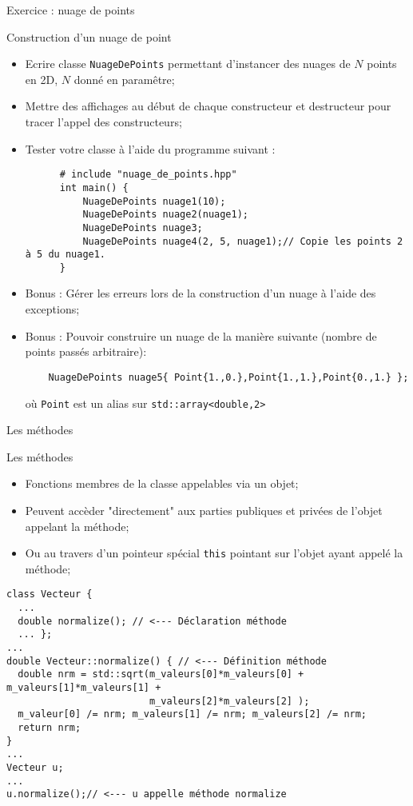 \documentclass[compress,10pt,aspectratio=169]{beamer}
\begin{document}
  \begin{frame}[fragile]{Exercice : nuage de points}
    \scriptsize
    \begin{exampleblock}{\small Construction d'un nuage de point}
    \begin{itemize}
      \item Ecrire classe \texttt{NuageDePoints} permettant d'instancer 
            des nuages de $N$ points en 2D, $N$ donné en paramêtre;
      \item Mettre des affichages au début de chaque constructeur et destructeur pour tracer 
            l'appel des constructeurs;
      \item Tester votre classe à l'aide du programme suivant :
      \begin{verbatim}
      # include "nuage_de_points.hpp"
      int main() {
          NuageDePoints nuage1(10);
          NuageDePoints nuage2(nuage1);
          NuageDePoints nuage3;
          NuageDePoints nuage4(2, 5, nuage1);// Copie les points 2 à 5 du nuage1.
      }
      \end{verbatim}
      \item Bonus : Gérer les erreurs lors de la construction d'un nuage à l'aide des exceptions;
      \item Bonus : Pouvoir construire un nuage de la manière suivante (nombre de points passés arbitraire):
    \begin{verbatim}
    NuageDePoints nuage5{ Point{1.,0.},Point{1.,1.},Point{0.,1.} };
    \end{verbatim}
    où \texttt{Point} est un alias sur \texttt{std::array<double,2>}
    \end{itemize}
    \end{exampleblock}
    \end{frame}

\begin{frame}[fragile]{Les méthodes}
\scriptsize
\vspace*{-4mm}
\begin{block}{\small Les méthodes}
\begin{itemize}
  \item Fonctions membres de la classe appelables via un objet;
  \item Peuvent accèder "directement" aux parties publiques et privées de l'objet appelant la méthode;
  \item Ou au travers d'un pointeur spécial \texttt{this} pointant sur l'objet ayant 
        appelé la méthode;
  \end{itemize}
  \end{block}
  
  \begin{verbatim}
class Vecteur {
  ...
  double normalize(); // <--- Déclaration méthode
  ... };
...
double Vecteur::normalize() { // <--- Définition méthode
  double nrm = std::sqrt(m_valeurs[0]*m_valeurs[0] + m_valeurs[1]*m_valeurs[1] +
                         m_valeurs[2]*m_valeurs[2] );
  m_valeur[0] /= nrm; m_valeurs[1] /= nrm; m_valeurs[2] /= nrm;
  return nrm;
}    
...
Vecteur u;
...
u.normalize();// <--- u appelle méthode normalize
\end{verbatim}
\end{frame}
  
\end{document}
